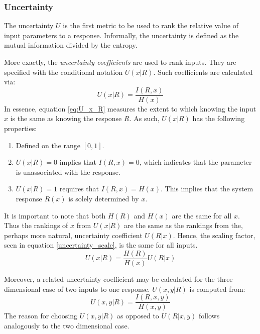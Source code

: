 \subsubsection{Uncertainty}
\label{cts_sec:uncertainty}

The uncertainty $U$ is the first metric to be used to rank the relative value of input 
parameters to a response.  Informally, the uncertainty is defined
as the mutual information divided by the entropy.

More exactly, the \emph{uncertainty coefficients} are used to rank inputs.  They are 
specified with the conditional notation $U(x|R)$.  Such coefficients are calculated via:
\begin{equation}
U(x|R) = \frac{I(R,x)}{H(x)}
\label{eq:U_x_R}
\end{equation}
In essence, equation \ref{eq:U_x_R} measures the extent to which knowing the input $x$ 
is the same as knowing the response $R$.  As such, $U(x|R)$ has the following properties:
\begin{enumerate}
    \item Defined on the range $[0, 1]$.
    \item $U(x|R) = 0$ implies that $I(R,x) = 0$, which indicates that the parameter
        is unassociated with the response.
    \item $U(x|R) = 1$ requires that $I(R,x) = H(x)$.  This implies that
        the system response $R(x)$ is solely determined by $x$.
\end{enumerate}

It is important to note that both $H(R)$ and $H(x)$ are the same for all $x$.  Thus the 
rankings of $x$ from $U(x|R)$ are the same as the rankings from the, perhaps more natural, 
uncertainty coefficient $U(R|x)$.  Hence, the scaling factor, seen in equation 
\ref{uncertainty_scale}, is the same for all inputs.
\begin{equation}
U(x|R) = \frac{H(R)}{H(x)} U(R|x)
\label{uncertainty_scale}
\end{equation}

Moreover, a related uncertainty coefficient may be calculated for the three dimensional 
case of two inputs to one
response.  $U(x,y|R)$ is computed from:
\begin{equation} U(x,y|R) = \frac{I(R,x,y)}{H(x,y)} \end{equation}
The reason for choosing $U(x,y|R)$ as opposed to $U(R|x,y)$ follows analogously to the 
two dimensional case.


